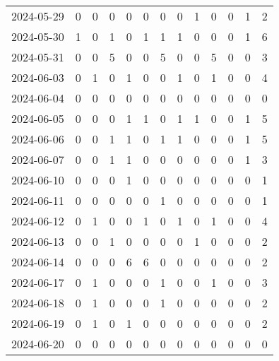 \documentclass[dvipdfmx,oneside]{article}
\begin{document}
\begin{longtable}{lcccccccccccc}
        2024-05-29 &     0 &     0 &     0 &     0 &     0 &     0 &     0 &     1 &     0 &     0 &     1 &      2 \\
        2024-05-30 &     1 &     0 &     1 &     0 &     1 &     1 &     1 &     0 &     0 &     0 &     1 &      6 \\
        2024-05-31 &     0 &     0 &     5 &     0 &     0 &     5 &     0 &     0 &     5 &     0 &     0 &      3 \\
        2024-06-03 &     0 &     1 &     0 &     1 &     0 &     0 &     1 &     0 &     1 &     0 &     0 &      4 \\
        2024-06-04 &     0 &     0 &     0 &     0 &     0 &     0 &     0 &     0 &     0 &     0 &     0 &      0 \\
        2024-06-05 &     0 &     0 &     0 &     1 &     1 &     0 &     1 &     1 &     0 &     0 &     1 &      5 \\
        2024-06-06 &     0 &     0 &     1 &     1 &     0 &     1 &     1 &     0 &     0 &     0 &     1 &      5 \\
        2024-06-07 &     0 &     0 &     1 &     1 &     0 &     0 &     0 &     0 &     0 &     0 &     1 &      3 \\
        2024-06-10 &     0 &     0 &     0 &     1 &     0 &     0 &     0 &     0 &     0 &     0 &     0 &      1 \\
        2024-06-11 &     0 &     0 &     0 &     0 &     0 &     1 &     0 &     0 &     0 &     0 &     0 &      1 \\
        2024-06-12 &     0 &     1 &     0 &     0 &     1 &     0 &     1 &     0 &     1 &     0 &     0 &      4 \\
        2024-06-13 &     0 &     0 &     1 &     0 &     0 &     0 &     0 &     1 &     0 &     0 &     0 &      2 \\
        2024-06-14 &     0 &     0 &     0 &     6 &     6 &     0 &     0 &     0 &     0 &     0 &     0 &      2 \\
        2024-06-17 &     0 &     1 &     0 &     0 &     0 &     1 &     0 &     0 &     1 &     0 &     0 &      3 \\
        2024-06-18 &     0 &     1 &     0 &     0 &     0 &     1 &     0 &     0 &     0 &     0 &     0 &      2 \\
        2024-06-19 &     0 &     1 &     0 &     1 &     0 &     0 &     0 &     0 &     0 &     0 &     0 &      2 \\
        2024-06-20 &     0 &     0 &     0 &     0 &     0 &     0 &     0 &     0 &     0 &     0 &     0 &      0 \\

\end{longtable}
\end{document}
